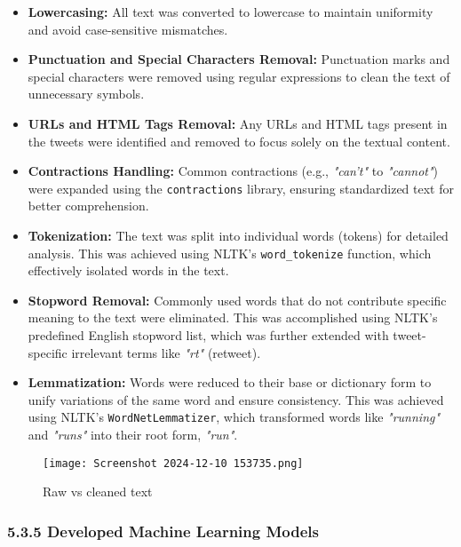 \documentclass[journal]{IEEEtran}
\begin{document}
\begin{itemize}
    \item \textbf{Lowercasing:} All text was converted to lowercase to maintain uniformity and avoid case-sensitive mismatches.
    
    \item \textbf{Punctuation and Special Characters Removal:} Punctuation marks and special characters were removed using regular expressions to clean the text of unnecessary symbols.
    
    \item \textbf{URLs and HTML Tags Removal:} Any URLs and HTML tags present in the tweets were identified and removed to focus solely on the textual content.
    
    \item \textbf{Contractions Handling:} Common contractions (e.g., \textit{"can't"} to \textit{"cannot"}) were expanded using the \texttt{contractions} library, ensuring standardized text for better comprehension.
    
    \item \textbf{Tokenization:} The text was split into individual words (tokens) for detailed analysis. This was achieved using NLTK's \texttt{word\_tokenize} function, which effectively isolated words in the text.
    
    \item \textbf{Stopword Removal:} Commonly used words that do not contribute specific meaning to the text were eliminated. This was accomplished using NLTK's predefined English stopword list, which was further extended with tweet-specific irrelevant terms like \textit{"rt"} (retweet).
    
    \item \textbf{Lemmatization:} Words were reduced to their base or dictionary form to unify variations of the same word and ensure consistency. This was achieved using NLTK's \texttt{WordNetLemmatizer}, which transformed words like \textit{"running"} and \textit{"runs"} into their root form, \textit{"run"}.
\end{itemize}

\begin{figure}[H]
\centering
\texttt{[image: Screenshot 2024-12-10 153735.png]}
\caption{Raw vs cleaned text}
\end{figure}

\subsubsection*{\textbf{5.3.5 Developed Machine Learning Models}}
\end{document}
